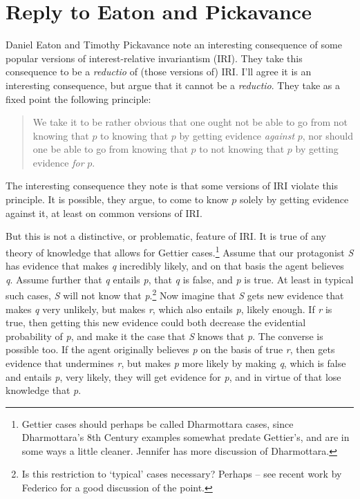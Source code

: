 \chapter{Reply to Eaton and Pickavance}


Daniel Eaton and Timothy Pickavance note an interesting consequence of some popular versions of interest-relative invariantism (IRI). They take this consequence to be a \emph{reductio} of (those versions of) IRI. I'll agree it is an interesting consequence, but argue that it cannot be a \emph{reductio}. They take as a fixed point the following principle:

\begin{quote}

We take it to be rather obvious that one ought not be able to go from not knowing that $p$ to knowing that $p$ by getting evidence \emph{against} $p$, nor should one be able to go from knowing that $p$ to not knowing that $p$ by getting evidence \emph{for} $p$. ~\citep[3142, emphasis in original]{EatonPickavance2015}
\end{quote}
The interesting consequence they note is that some versions of IRI violate this principle. It is possible, they argue, to come to know $p$ solely by getting evidence against it, at least on common versions of IRI.

But this is not a distinctive, or problematic, feature of IRI. It is true of any theory of knowledge that allows for Gettier cases.\footnote{Gettier cases should perhaps be called Dharmottara cases, since Dharmottara's 8th Century examples somewhat predate Gettier's, and are in some ways a little cleaner. Jennifer  \citet[57]{Nagel2014} has more discussion of Dharmottara.} Assume that our protagonist \emph{S} has evidence that makes \emph{q} incredibly likely, and on that basis the agent believes \emph{q}. Assume further that \emph{q} entails \emph{p}, that \emph{q} is false, and \emph{p} is true. At least in typical such cases, \emph{S} will not know that \emph{p}.\footnote{Is this restriction to `typical' cases necessary? Perhaps -- see recent work by Federico  \citet{Luzzi2010} for a good discussion of the point.} Now imagine that \emph{S} gets new evidence that makes \emph{q} very unlikely, but makes \emph{r}, which also entails \emph{p}, likely enough. If \emph{r} is true, then getting this new evidence could both decrease the evidential probability of \emph{p}, and make it the case that \emph{S} knows that \emph{p}. The converse is possible too. If the agent originally believes \emph{p} on the basis of true \emph{r}, then gets evidence that undermines \emph{r}, but makes \emph{p} more likely by making \emph{q}, which is false and entails \emph{p}, very likely, they will get evidence for \emph{p}, and in virtue of that lose knowledge that \emph{p}.

